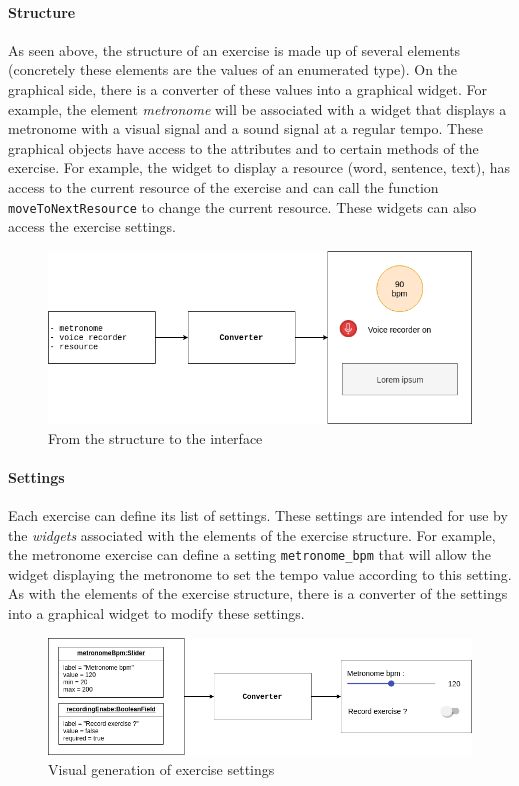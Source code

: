 \paragraph{Structure}
As seen above, the structure of an exercise is made up of several elements (concretely these elements are the values of an enumerated type). On the graphical side, there is a converter of these values into a graphical widget. For example, the element \textit{metronome} will be associated with a widget that displays a metronome with a visual signal and a sound signal at a regular tempo. These graphical objects have access to the attributes and to certain methods of the exercise. For example, the widget to display a resource (word, sentence, text), has access to the current resource of the exercise and can call the function \texttt{moveToNextResource} to change the current resource. These widgets can also access the exercise settings.

\begin{figure}[H]
  \includegraphics[width=0.8\linewidth]{content/imgs/struc.png}
  \caption{From the structure to the interface}
  \label{fig:struc}
\end{figure}

\paragraph{Settings}
Each exercise can define its list of settings. These settings are intended for use by the \textit{widgets} associated with the elements of the exercise structure. For example, the metronome exercise can define a setting \texttt{metronome\_bpm} that will allow the widget displaying the metronome to set the tempo value according to this setting. As with the elements of the exercise structure, there is a converter of the settings into a graphical widget to modify these settings.

\begin{figure}[H]
  \includegraphics[width=0.8\linewidth]{content/imgs/settings.png}
  \caption{Visual generation of exercise settings}
  \label{fig:settings}
\end{figure}

